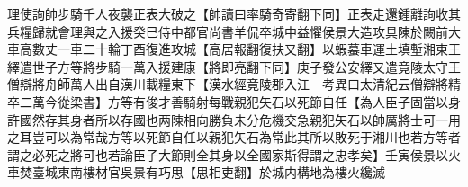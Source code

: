 理使詢帥步騎千人夜襲正表大破之【帥讀曰率騎奇寄翻下同】正表走還鍾離詢收其兵糧歸就會理與之入援癸巳侍中都官尚書羊侃卒城中益懼侯景大造攻具陳於闕前大車高數丈一車二十輪丁酉復進攻城【高居報翻復扶又翻】以蝦蟇車運土填塹湘東王繹遣世子方等將步騎一萬入援建康【將即亮翻下同】庚子發公安繹又遣竟陵太守王僧辯將舟師萬人出自漢川載糧東下【漢水經竟陵郡入江　考異曰太清紀云僧辯將精卒二萬今從梁書】方等有俊才善騎射每戰親犯矢石以死節自任【為人臣子固當以身許國然存其身者所以存國也两陳相向勝負未分危機交急親犯矢石以帥厲將士可一用之耳豈可以為常哉方等以死節自任以親犯矢石為常此其所以敗死于湘川也若方等者謂之必死之將可也若論臣子大節則全其身以全國家斯得謂之忠孝矣】壬寅侯景以火車焚臺城東南樓材官吳景有巧思【思相吏翻】於城内構地為樓火纔滅